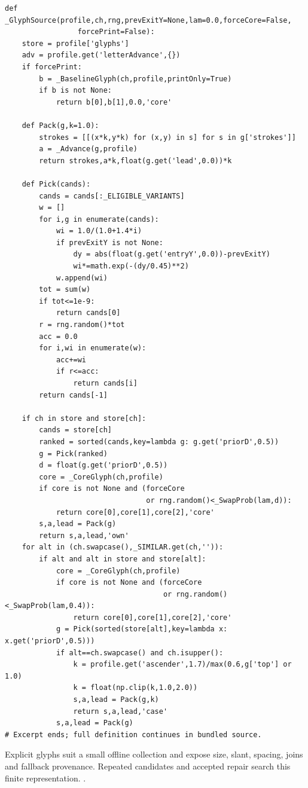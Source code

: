 \begin{lstlisting}[style=plain]
def _GlyphSource(profile,ch,rng,prevExitY=None,lam=0.0,forceCore=False,
                 forcePrint=False):
    store = profile['glyphs']
    adv = profile.get('letterAdvance',{})
    if forcePrint:
        b = _BaselineGlyph(ch,profile,printOnly=True)
        if b is not None:
            return b[0],b[1],0.0,'core'

    def Pack(g,k=1.0):
        strokes = [[(x*k,y*k) for (x,y) in s] for s in g['strokes']]
        a = _Advance(g,profile)
        return strokes,a*k,float(g.get('lead',0.0))*k

    def Pick(cands):
        cands = cands[:_ELIGIBLE_VARIANTS]
        w = []
        for i,g in enumerate(cands):
            wi = 1.0/(1.0+1.4*i)
            if prevExitY is not None:
                dy = abs(float(g.get('entryY',0.0))-prevExitY)
                wi*=math.exp(-(dy/0.45)**2)
            w.append(wi)
        tot = sum(w)
        if tot<=1e-9:
            return cands[0]
        r = rng.random()*tot
        acc = 0.0
        for i,wi in enumerate(w):
            acc+=wi
            if r<=acc:
                return cands[i]
        return cands[-1]

    if ch in store and store[ch]:
        cands = store[ch]
        ranked = sorted(cands,key=lambda g: g.get('priorD',0.5))
        g = Pick(ranked)
        d = float(g.get('priorD',0.5))
        core = _CoreGlyph(ch,profile)
        if core is not None and (forceCore
                                 or rng.random()<_SwapProb(lam,d)):
            return core[0],core[1],core[2],'core'
        s,a,lead = Pack(g)
        return s,a,lead,'own'
    for alt in (ch.swapcase(),_SIMILAR.get(ch,'')):
        if alt and alt in store and store[alt]:
            core = _CoreGlyph(ch,profile)
            if core is not None and (forceCore
                                     or rng.random()<_SwapProb(lam,0.4)):
                return core[0],core[1],core[2],'core'
            g = Pick(sorted(store[alt],key=lambda x: x.get('priorD',0.5)))
            if alt==ch.swapcase() and ch.isupper():
                k = profile.get('ascender',1.7)/max(0.6,g['top'] or 1.0)
                k = float(np.clip(k,1.0,2.0))
                s,a,lead = Pack(g,k)
                return s,a,lead,'case'
            s,a,lead = Pack(g)
# Excerpt ends; full definition continues in bundled source.
\end{lstlisting}
Explicit glyphs suit a small offline collection and expose size, slant, spacing, joins and fallback provenance. Repeated candidates and accepted repair search this finite representation. \cite{haines2016,gravesgenerate,ganwriting,onedm}.


